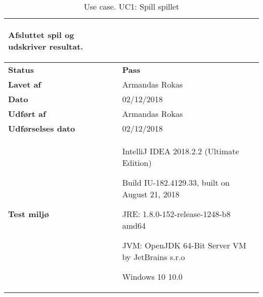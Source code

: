 \documentclass[class=article, crop=false]{standalone}
\makeatletter
\let\savespace\@minipagetrue
\makeatother
\begin{document}
\begin{table}[H]
\begin{tabularx}{\textwidth}{|l|X|}
\begin{tabenum}
\begin{compactitem}
                                  \end{compactitem}
                                      \item Afsluttet spil og udskriver resultat.
                                   \end{tabenum}   \\ \hline
            \textbf{Status} & \textbf{Pass} \\ \hline
            \textbf{Lavet af} & Armandas Rokas \\ \hline
            \textbf{Dato} & 02/12/2018 \\ \hline
            \textbf{Udført af } & Armandas Rokas \\ \hline
            \textbf{Udførselses dato}  & 02/12/2018 \\ \hline
            \textbf{Test miljø}  &  \savespace \begin{compactitem}
                                                   \item IntelliJ IDEA 2018.2.2 (Ultimate Edition)
                                                   \item Build IU-182.4129.33, built on August 21, 2018
                                                   \item JRE: 1.8.0-152-release-1248-b8 amd64
                                                   \item JVM: OpenJDK 64-Bit Server VM by JetBrains s.r.o
                                                   \item Windows 10 10.0
            \end{compactitem} \\ \hline
        \end{tabularx}
        \caption{Use case. UC1: Spill spillet}

    \end{table}
\end{document}
